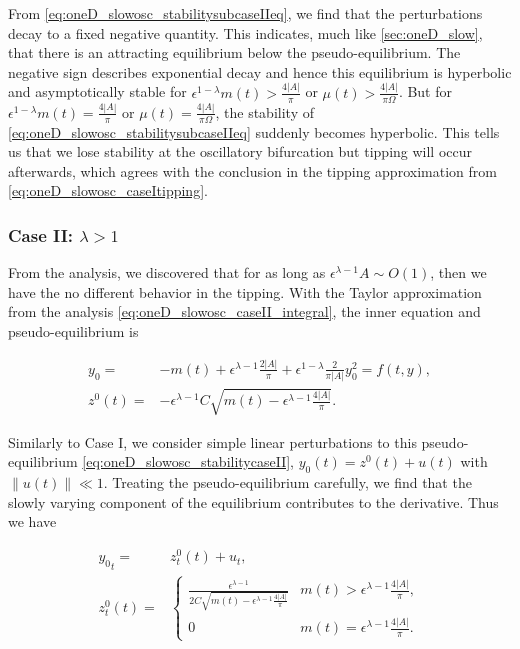 From \eqref{eq:oneD_slowosc_stabilitysubcaseIIeq}, we find that the perturbations decay to a fixed negative quantity. This indicates, much like \autoref{sec:oneD_slow}, that there is an attracting equilibrium below the pseudo-equilibrium. The negative sign describes exponential decay and hence this equilibrium is hyperbolic and asymptotically stable for $\epsilon^{1-\lambda}m(t)>\frac{4|A|}{\pi}$ or $\mu(t)>\frac{4|A|}{\pi \Omega}$. But for $\epsilon^{1-\lambda}m(t)=\frac{4|A|}{\pi}$ or $\mu(t) =\frac{4|A|}{\pi \Omega}$, the stability of \eqref{eq:oneD_slowosc_stabilitysubcaseIIeq} suddenly becomes hyperbolic. This tells us that we lose stability at the oscillatory bifurcation but tipping will occur afterwards, which agrees with the conclusion in the tipping approximation from \eqref{eq:oneD_slowosc_caseItipping}.

\subsubsection{Case II: $\lambda>1$}

From the analysis, we discovered that for as long as $\epsilon^{\lambda-1}A\sim O(1)$, then we have the no different behavior in the tipping. With the Taylor approximation from the analysis \eqref{eq:oneD_slowosc_caseII_integral}, the inner equation and pseudo-equilibrium is

\begin{equation}\label{eq:oneD_slowosc_stabilitycaseII}
\begin{aligned}
y_0=&-m(t) +\epsilon^{\lambda-1}\frac{2|A|}{\pi}+\epsilon^{1-\lambda}\frac{2}{\pi |A|}y_0^2=f(t,y),\\
z^0(t)=&-\epsilon^{\lambda-1}C\sqrt{m(t)-\epsilon^{\lambda-1}\frac{4|A|}{\pi}}.
\end{aligned}
\end{equation}

Similarly to Case I, we consider simple linear perturbations to this pseudo-equilibrium \eqref{eq:oneD_slowosc_stabilitycaseII}, $y_0(t)=z^0(t)+u(t)$ with $\lVert u(t) \rVert \ll 1$. Treating the pseudo-equilibrium carefully, we find that the slowly varying component of the equilibrium contributes to the derivative. Thus we have

\begin{equation}
\begin{aligned}
{y_0}_t =& z^0_t(t) +u_t,\\
z^0_t(t) = & \begin{cases}
\frac{\epsilon^{\lambda-1}}{2C\sqrt{m(t)-\epsilon^{\lambda-1}\frac{4|A|}{\pi}}} & m(t)> \epsilon^{\lambda-1}\frac{4|A|}{\pi},\\
0 & m(t) =\epsilon^{\lambda-1}\frac{4|A|}{\pi}.
\end{cases}
\end{aligned}
\end{equation}

